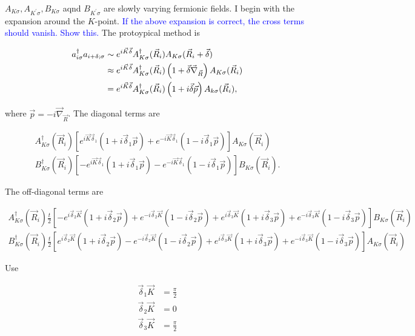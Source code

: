 \documentclass[../../../main.tex]{subfiles}
\begin{document}
$A_{K\sigma}, A_{K^\prime\sigma}, B_{K\sigma}$ aqnd $ B_{K^\prime\sigma}$ are slowly varying fermionic fields. I begin with the expansion around the $K$-point. \textcolor{blue}{If the above expansion is correct, the cross terms should vanish. Show this.} The protoypical method is 

\begin{align}
	a_{i\sigma}^\dagger a_{i+\delta;\sigma} &\sim e^{i\vec{K}\vec{\delta}}A^\dagger_{K\sigma}(\vec{R}_i)A_{K\sigma}(\vec{R}_i + \vec{\delta}) \notag \\
	&\approx e^{i\vec{K}\vec{\delta}} A^\dagger_{K\sigma}(\vec{R}_i)\left(1+\vec{\delta}\vec{\nabla}_{\vec{R}}\right)A_{K\sigma}(\vec{R}_i) \notag \\
	&= e^{i\vec{K}\vec{\delta}} A^\dagger_{K\sigma}(\vec{R}_i)\left(1+i\vec{\delta}\vec{p}\right)A_{k\sigma}(\vec{R}_i),
\end{align}

where $\vec{p} = -i\vec{\nabla}_{\vec{R}}$. The diagonal terms are 

\begin{gather}
	A^\dagger_{K\sigma}(\vec{R}_i)\left[e^{i\vec{K}\vec{\delta}_1}(1+i\vec{\delta}_1\vec{p}) + e^{-i\vec{K}\vec{\delta}_1}(1-i\vec{\delta}_1\vec{p})\right]A_{K\sigma}(\vec{R}_i) \label{mael11}\\
	B^\dagger_{K\sigma}(\vec{R}_i)\left[-e^{i\vec{K}\vec{\delta}_1}(1+i\vec{\delta}_1\vec{p}) - e^{-i\vec{K}\vec{\delta}_1}(1-i\vec{\delta}_1\vec{p})\right]B_{K\sigma}(\vec{R}_i).
\end{gather}

The off-diagonal terms are 

\begin{gather}
	A^\dagger_{K\sigma}(\vec{R}_i)\frac{t}{2}\left[-e^{i\vec{\delta}_2\vec{K}}(1+i\vec{\delta}_2\vec{p}) + e^{-i\vec{\delta}_2\vec{K}}(1-i\vec{\delta}_2\vec{p}) + e^{i\vec{\delta}_3\vec{K}}(1+i\vec{\delta}_3\vec{p}) + e^{-i\vec{\delta}_3\vec{K}}(1-i\vec{\delta}_3\vec{p})\right]B_{K\sigma}(\vec{R}_i) \\
B^\dagger_{K\sigma}(\vec{R}_i)\frac{t}{2}\left[e^{i\vec{\delta}_2\vec{K}}(1+i\vec{\delta}_2\vec{p}) - e^{-i\vec{\delta}_2\vec{K}}(1-i\vec{\delta}_2\vec{p}) + e^{i\vec{\delta}_3\vec{K}}(1+i\vec{\delta}_3\vec{p}) + e^{-i\vec{\delta}_3\vec{K}}(1-i\vec{\delta}_3\vec{p})\right]A_{K\sigma}(\vec{R}_i)\end{gather}

Use 

\begin{align}
	\vec{\delta}_1\vec{K} &= \frac{\pi}{2} \\
	\vec{\delta}_2\vec{K} &=0 \\
	\vec{\delta}_3\vec{K} &= \frac{\pi}{2}
\end{align}
\end{document}
